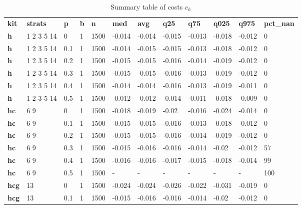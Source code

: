 \begin{longtable}[h]{|p{0.8cm}|p{1.5cm}|p{1cm}|p{1cm}|p{1cm}|p{1cm}|p{1cm}|p{1cm}|p{1cm}|p{1cm}|p{1cm}|p{1.5cm}|}
\caption{Summary table of costs $c_h$}
\label{tab:costs_mod_h} \\
      \hline
\textbf{ kit} & \textbf{ strats} & \textbf{ p} & \textbf{ b} & \textbf{ n} & \textbf{ med} & \textbf{ avg} & \textbf{ q25} & \textbf{ q75} & \textbf{ q025} & \textbf{ q975} & \textbf{ pct\_nan}
           \\
  \textbf{h   } &  1 2 3 5 14 &   0 & 1 & 1500 & -0.014 & -0.014 & -0.015 & -0.013 & -0.018 & -0.012 &   0
    \\ \hline
  \textbf{h   } &  1 2 3 5 14 & 0.1 & 1 & 1500 & -0.014 & -0.015 & -0.015 & -0.013 & -0.018 & -0.012 &   0
    \\ \hline
  \textbf{h   } &  1 2 3 5 14 & 0.2 & 1 & 1500 & -0.015 & -0.015 & -0.016 & -0.014 & -0.019 & -0.012 &   0
    \\ \hline
  \textbf{h   } &  1 2 3 5 14 & 0.3 & 1 & 1500 & -0.015 & -0.015 & -0.016 & -0.013 & -0.019 & -0.012 &   0
    \\ \hline
  \textbf{h   } &  1 2 3 5 14 & 0.4 & 1 & 1500 & -0.014 & -0.014 & -0.016 & -0.013 & -0.019 & -0.011 &   0
    \\ \hline
  \textbf{h   } &  1 2 3 5 14 & 0.5 & 1 & 1500 & -0.012 & -0.012 & -0.014 & -0.011 & -0.018 & -0.009 &   0
    \\ \hline
  \textbf{hc  } &  6 9        &   0 & 1 & 1500 & -0.018 & -0.019 &  -0.02 & -0.016 & -0.024 & -0.014 &   0
    \\ \hline
  \textbf{hc  } &  6 9        & 0.1 & 1 & 1500 & -0.015 & -0.015 & -0.016 & -0.013 & -0.018 & -0.012 &   0
    \\ \hline
  \textbf{hc  } &  6 9        & 0.2 & 1 & 1500 & -0.015 & -0.015 & -0.016 & -0.014 & -0.019 & -0.012 &   0
    \\ \hline
  \textbf{hc  } &  6 9        & 0.3 & 1 & 1500 & -0.015 & -0.016 & -0.016 & -0.014 &  -0.02 & -0.012 &  57
    \\ \hline
  \textbf{hc  } &  6 9        & 0.4 & 1 & 1500 & -0.016 & -0.016 & -0.017 & -0.015 & -0.018 & -0.014 &  99
    \\ \hline
  \textbf{hc  } &  6 9        & 0.5 & 1 & 1500 & - & - & - & - & - & - & 100
    \\ \hline
  \textbf{hcg } &  13         &   0 & 1 & 1500 & -0.024 & -0.024 & -0.026 & -0.022 & -0.031 & -0.019 &   0
    \\ \hline
  \textbf{hcg } &  13         & 0.1 & 1 & 1500 & -0.015 & -0.016 & -0.016 & -0.014 &  -0.02 & -0.012 &   0

\end{longtable}
